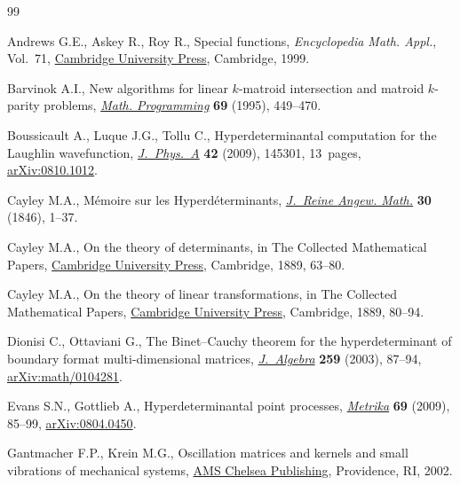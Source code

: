 \begin{thebibliography}{99}
\footnotesize\itemsep=0pt

Andrews G.E., Askey R., Roy R., Special functions, \textit{Encyclopedia Math.
 Appl.}, Vol.~71, \href{https://doi.org/10.1017/CBO9781107325937}{Cambridge
 University Press}, Cambridge, 1999.

Barvinok A.I., New algorithms for linear {$k$}-matroid intersection and matroid
 {$k$}-parity problems,
 \href{https://doi.org/10.1007/BF01585571}{\textit{Math. Programming}}
 \textbf{69} (1995), 449--470.

Boussicault A., Luque J.G., Tollu C., Hyperdeterminantal computation for the
 {L}aughlin wavefunction,
 \href{https://doi.org/10.1088/1751-8113/42/14/145301}{\textit{J.~Phys.~A}}
 \textbf{42} (2009), 145301, 13~pages,
 \href{http://arxiv.org/abs/0810.1012}{arXiv:0810.1012}.

Cayley M.A., M\'emoire sur les {H}yperd\'eterminants,
 \href{https://doi.org/10.1515/crll.1846.30.1}{\textit{J.~Reine Angew. Math.}}
 \textbf{30} (1846), 1--37.

Cayley M.A., On the theory of determinants, in The {C}ollected {M}athematical
 {P}apers, \href{https://doi.org/10.1017/CBO9780511703676.013}{Cambridge
 University Press}, Cambridge, 1889, 63--80.

Cayley M.A., On the theory of linear transformations, in The {C}ollected
 {M}athematical {P}apers,
 \href{https://doi.org/10.1017/CBO9780511703676.014}{Cambridge University
 Press}, Cambridge, 1889, 80--94.

Dionisi C., Ottaviani G., The {B}inet--{C}auchy theorem for the
 hyperdeterminant of boundary format multi-dimensional matrices,
 \href{https://doi.org/10.1016/S0021-8693(02)00537-9}{\textit{J.~Algebra}}
 \textbf{259} (2003), 87--94,
 \href{http://arxiv.org/abs/math/0104281}{arXiv:math/0104281}.

Evans S.N., Gottlieb A., Hyperdeterminantal point processes,
 \href{https://doi.org/10.1007/s00184-008-0209-0}{\textit{Metrika}}
 \textbf{69} (2009), 85--99,
 \href{http://arxiv.org/abs/0804.0450}{arXiv:0804.0450}.

Gantmacher F.P., Krein M.G., Oscillation matrices and kernels and small
 vibrations of mechanical systems, \href{https://doi.org/10.1090/chel/345}{AMS
 Chelsea Publishing}, Providence, RI, 2002.


\end{thebibliography}
